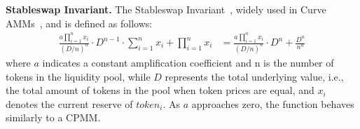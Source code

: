 \noindent\textbf{Stableswap Invariant.}
The Stableswap Invariant~\cite{StableSwap}, widely used in Curve AMMs~\cite{Curve}, and is defined as follows:
\begin{align}
\label{Stableswap}
    \frac{a\prod_{i=1}^{n} x_i}{(D/n)^{n}} \cdot D^{n-1} \cdot \sum_{i=1}^{n} x_i + \prod_{i=1}^{n} x_i &= \frac{a\prod_{i=1}^{n} x_i}{(D/n)^n} \cdot D^n + \frac{D^n}{n^n} \nonumber
\end{align}
where $a$ indicates a constant amplification coefficient and n is the number of tokens in the liquidity pool, while $D$ represents the total underlying value, i.e., the total amount of tokens in the pool when token prices are equal, and $x_i$ denotes the current reserve of $token_i$. 
As $a$ approaches zero, the function behaves similarly to a CPMM.

